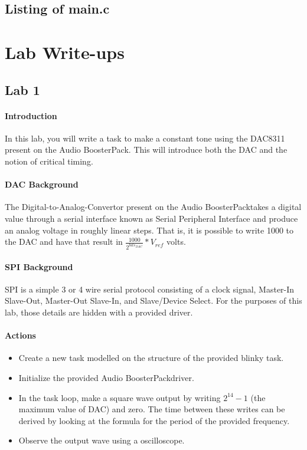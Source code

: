 \documentclass[titlepage]{article}
\begin{document}
\subsection{Listing of main.c}

\pagebreak
\section{Lab Write-ups}
\subsection{Lab 1}

\paragraph{Introduction}
In this lab, you will write a task to make a constant tone using the DAC8311 present on the 
Audio BoosterPack\textregistered. This will introduce both the DAC and the notion of critical timing.

\paragraph{DAC Background}
The Digital-to-Analog-Convertor present on the Audio BoosterPack\textregistered takes a digital value 
through a serial interface known as Serial Peripheral Interface and produce an analog voltage in roughly 
linear steps. That is, it is possible to write 1000 to the DAC and have that result in $\frac{1000}{2^{bits_{DAC}}} * V_{ref}$ volts.

\paragraph{SPI Background}
SPI is a simple 3 or 4 wire serial protocol consisting of a clock signal, Master-In Slave-Out, Master-Out Slave-In, 
and Slave/Device Select. For the purposes of this lab, those details are hidden with a provided driver.

\paragraph{Actions}
\begin{itemize}
    \item Create a new task modelled on the structure of the provided blinky task.
    \item Initialize the provided Audio BoosterPack\textregistered\space driver.
    \item In the task loop, make a square wave output by writing ${2^{14}-1}$ (the maximum value of DAC) 
        and zero. The time between these writes can be derived by looking at the formula for the 
        period of the provided frequency.
    \item Observe the output wave using a oscilloscope.
\end{itemize}
\pagebreak
\end{document}
